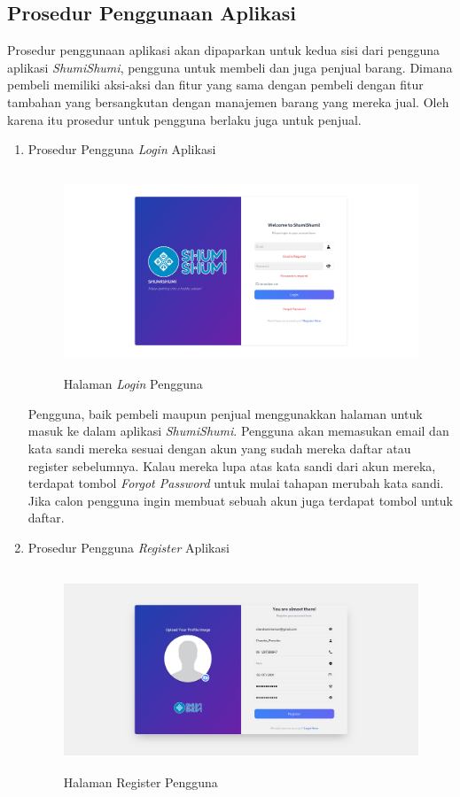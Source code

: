 \documentclass[a4paper]{article}
\newcommand{\subbab}[1]{%
    \subsection{#1}%
    \setcounter{figure}{0}
    \setcounter{table}{0}
}
\begin{document}
\newpage
\subbab{Prosedur Penggunaan Aplikasi}

Prosedur penggunaan aplikasi akan dipaparkan untuk kedua sisi dari pengguna aplikasi \textit{ShumiShumi}, pengguna untuk membeli dan juga penjual barang. Dimana pembeli memiliki aksi-aksi dan fitur yang sama dengan pembeli dengan fitur tambahan yang bersangkutan dengan manajemen barang yang mereka jual. Oleh karena itu prosedur untuk pengguna berlaku juga untuk penjual.

\begin{enumerate}

\item Prosedur Pengguna \textit{Login} Aplikasi

\begin{figure}[h]
    \centering
    \includegraphics*[height=6cm]{images/prosedur pengunaan aplikasi/login.png}
    \caption{Halaman \textit{Login} Pengguna}
\end{figure}

Pengguna, baik pembeli maupun penjual menggunakkan halaman untuk masuk ke dalam aplikasi \textit{ShumiShumi}. Pengguna akan memasukan email dan kata sandi mereka sesuai dengan akun yang sudah mereka daftar atau register sebelumnya. Kalau mereka lupa atas kata sandi dari akun mereka, terdapat tombol \textit{Forgot Password} untuk mulai tahapan merubah kata sandi. Jika calon pengguna ingin membuat sebuah akun juga terdapat tombol untuk daftar.

\item Prosedur Pengguna \textit{Register} Aplikasi

\begin{figure}[h]
    \centering
    \includegraphics*[height=6cm]{images/prosedur pengunaan aplikasi/Register.png}
    \caption{Halaman Register Pengguna}
\end{figure}


\end{enumerate}
\end{document}
